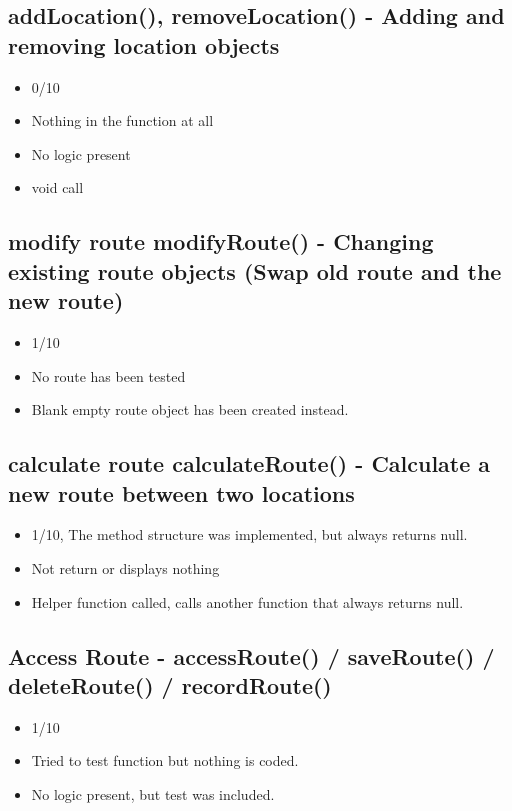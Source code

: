 \documentclass[12pt]{article}
\begin{document}
\subsection{addLocation(), removeLocation() - Adding and removing location objects}
\begin{itemize}
 \item 0/10
 \item Nothing in the function at all
 \item No logic present 
 \item void call
\end{itemize}

\subsection{modify route modifyRoute() - Changing existing route objects (Swap old route and the new route)}
\begin{itemize}
\item 1/10
\item No route has been tested 
\item Blank empty route object has been created instead.
\end{itemize}

\subsection{calculate route calculateRoute() - Calculate a new route between two locations}
\begin{itemize}
\item 1/10, The method structure was implemented, but always returns null.
\item Not return or displays nothing
\item Helper function called, calls another function that always returns null.
\end{itemize}

\subsection{Access Route - accessRoute() / saveRoute() / deleteRoute() / recordRoute()}
\begin{itemize}
\item 1/10
\item Tried to test function but nothing is coded.
\item No logic present, but test was included.
\end{itemize}
\end{document}
